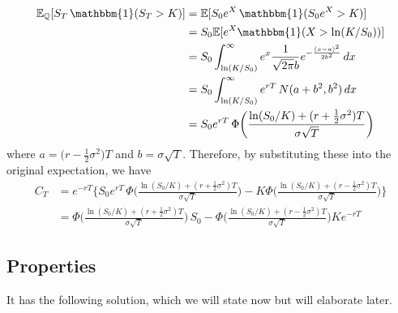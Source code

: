 \documentclass{article}
\begin{document}
    \begin{align}
      \mathbb{E}_{\mathbb{Q}} [S_T \, \mathbbm{1} (S_T > K)] & = \mathbb{E} [S_0 e^X \, \mathbbm{1} (S_0 e^X > K)] \\
                                                             & = S_0 \mathbb{E} [ e^X \mathbbm{1}(X > \ln (K/S_0))] \\
                                                             & = S_0 \int_{\ln(K/S_0)}^\infty e^x \frac{1}{\sqrt{2 \pi} b} e^{-\frac{(x - a)^2}{2 b^2}} \,dx \\
                                                             & = S_0 \int_{\ln(K/S_0)}^\infty e^{rT} \, N(a + b^2, b^2) \,dx \\ 
                                                             & = S_0 e^{rT} \, \Phi \bigg( \frac{\ln(S_0 /K) + (r + \frac{1}{2} \sigma^2) T}{\sigma \sqrt{T}} \bigg)
    \end{align}
    where $a = \big( r - \frac{1}{2} \sigma^2 \big) T$ and $b = \sigma \sqrt{T}$. Therefore, by substituting these into the original expectation, we have 
    \begin{align}
      C_T & = e^{-rT} \bigg\{ S_0 e^{rT} \, \Phi \bigg( \frac{\ln(S_0 /K) + (r + \frac{1}{2} \sigma^2) T}{\sigma \sqrt{T}} \bigg) - K \Phi \bigg( \frac{\ln(S_0 /K) + (r - \frac{1}{2} \sigma^2) T}{\sigma \sqrt{T}} \bigg) \bigg\} \\
          & = \Phi \bigg( \frac{\ln(S_0 /K) + (r + \frac{1}{2} \sigma^2) T}{\sigma \sqrt{T}} \bigg) \, S_0 - \Phi \bigg( \frac{\ln(S_0 /K) + (r - \frac{1}{2} \sigma^2) T}{\sigma \sqrt{T}} \bigg) K e^{-r T}
    \end{align}

  \subsection{Properties}

    It has the following solution, which we will state now but will elaborate later. 
\end{document}
